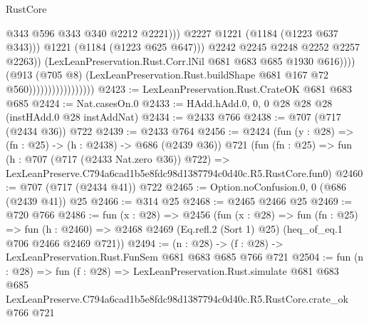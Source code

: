 \begin{lexlean}{RustCore}
\begin{coremodule}
                                                      @343
                                                      @596
                                                      @343
                                                      @340
                                                      @2212
                                                      @2221)))
                                                @2227
                                                @1221
                                                (@1184 (@1223 @637 @343)))
                                              @1221
                                              (@1184 (@1223 @625 @647)))
                                            @2242
                                            @2245
                                            @2248
                                            @2252
                                            @2257
                                            @2263))
                                        (LexLeanPreservation.Rust.Corr.lNil
                                          @681
                                          @683
                                          @685
                                          @1930
                                          @616))))
                                  (@913
                                    (@705 @8)
                                    (LexLeanPreservation.Rust.buildShape
                                      @681
                                      @167
                                      @72
                                      @560)))))))))))))))))
@2423 := LexLeanPreservation.Rust.CrateOK @681 @683 @685
@2424 := Nat.casesOn.{0}
@2433 := HAdd.hAdd.{0, 0, 0} @28 @28 @28 (instHAdd.{0} @28 instAddNat)
@2434 := @2433 @766
@2438 := @707 (@717 (@2434 @36)) @722
@2439 := @2433 @764
@2456 := @2424
    (fun (y : @28) => (fn : @25) -> (h : @2438) -> @686 (@2439 @36))
    @721
    (fun (fn : @25) =>
    fun (h : @707 (@717 (@2433 Nat.zero @36)) @722) =>
    LexLeanPreserve.C794a6cad1b5e8fdc98d1387794c0d40c.R5.RustCore.fun0)
@2460 := @707 (@717 (@2434 @41)) @722
@2465 := Option.noConfusion.{0, 0} (@686 (@2439 @41)) @25
@2466 := @314 @25
@2468 := @2465 @2466 @25
@2469 := @720 @766
@2486 := fun (x : @28) =>
  @2456
    (fun (x : @28) =>
    fun (fn : @25) =>
    fun (h : @2460) => @2468 @2469 (Eq.refl.{2} (Sort 1) @25) (heq_of_eq.{1} @706 @2466 @2469 @721))
@2494 := (n : @28) -> (f : @28) -> LexLeanPreservation.Rust.FunSem @681 @683 @685 @766 @721
@2504 := fun (n : @28) =>
  fun (f : @28) =>
  LexLeanPreservation.Rust.simulate
    @681
    @683
    @685
    LexLeanPreserve.C794a6cad1b5e8fdc98d1387794c0d40c.R5.RustCore.crate_ok
    @766
    @721
\end{coremodule}
\end{lexlean}
